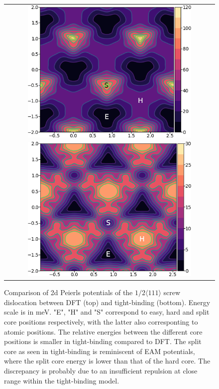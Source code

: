 \documentclass[a4paper,11pt]{article}
\begin{document}
        \begin{figure}
    \begin{tabular}{c}
	     \includegraphics[width=0.8\textwidth]{../Images/itakura_dislocation_energy_landscape_2_labelled.png} \\
             \includegraphics[width=0.8\textwidth]{../Images/tbe_dislocation_energy_landscape_pure_labelled.png}  \\
    \end{tabular}		
\caption{Comparison of 2d Peierls potentials of the $1/2\langle 111\rangle$ screw dislocation between DFT \cite{Itakura2012} (top) and tight-binding (bottom). Energy scale is in meV. "E", "H" and "S" correspond to easy, hard and split core positions respectively, with the latter also corresponting to atomic positions. The relative energies between the different core positions is smaller in tight-binding compared to DFT. The split core as seen in tight-binding is reminiscent of EAM potentials, where the split core energy is lower than that of the hard core. The discrepancy is probably due to an insufficient repulsion at close range within the tight-binding model.}
	\label{fig:peierlspot}
    \end{figure}
\end{document}

